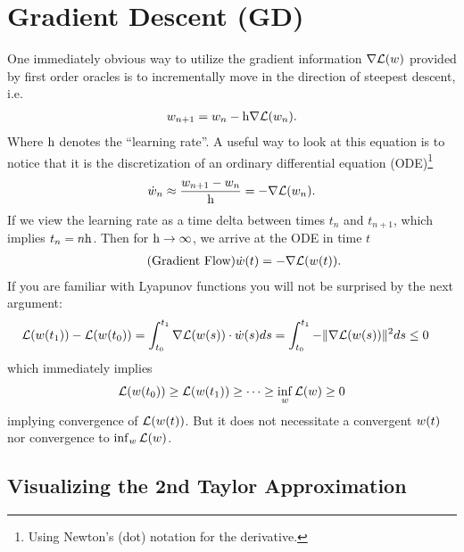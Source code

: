 
\chapter{Gradient Descent (GD)}\label{chap: gradient descent}

One immediately obvious way to utilize the gradient information
\(\nabla\mathcal{L}(w)\) provided by first order oracles is to incrementally
move in the direction of steepest descent, i.e.
%
\begin{align*}
	w_{n+1} = w_n - \text{h}\nabla \mathcal{L}(w_n).
\end{align*}
%
Where \(\text{h}\) denotes the ``learning rate''. A useful way to look at this
equation is to notice that it is the discretization of an ordinary differential
equation (ODE)\footnote{
	Using Newton's (dot) notation for the derivative.
}
%
\begin{align*}
	\dot{w}_n \approx \frac{w_{n+1} - w_n}{\text{h}}
	= - \nabla \mathcal{L}(w_n).
\end{align*}
%
If we view the learning rate as a time delta between times
\(t_n\) and \(t_{n+1}\), which implies \(t_n = n\text{h}\). Then for
\(\text{h}\to\infty\), we arrive at the ODE in time \(t\)
%
\begin{align}\label{eq: velocity is gradient}
	\tag{Gradient Flow}
	\dot{w}(t) = -\nabla \mathcal{L}(w(t)).
\end{align}
%
If you are familiar with Lyapunov functions you will not be surprised by the
next argument:
%
\begin{align}\label{eq: gradient integral}
	\mathcal{L}(w(t_1)) - \mathcal{L}(w(t_0))
	&= \int_{t_0}^{t_1} \nabla \mathcal{L}(w(s)) \cdot \dot{w}(s) ds
	= \int_{t_0}^{t_1} -\|\nabla \mathcal{L}(w(s))\|^2 ds
	\le 0
\end{align}
%
which immediately implies
%
\begin{align*}
	\mathcal{L}(w(t_0)) \ge \mathcal{L}(w(t_1)) \ge \dots \ge \inf_w \mathcal{L}(w) \ge 0
\end{align*}
implying convergence of \(\mathcal{L}(w(t))\). But it does not necessitate a
convergent \(w(t)\) nor convergence to \(\inf_w
\mathcal{L}(w)\).

\section{Visualizing the 2nd Taylor Approximation}\label{sec: visualize gd}

